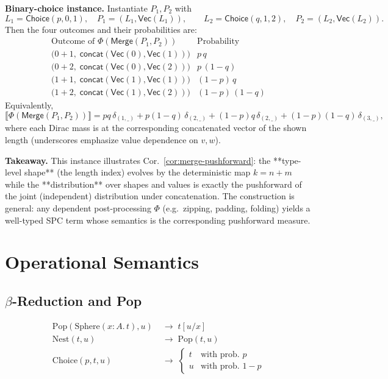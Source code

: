 \documentclass{article}
\begin{document}
\medskip
\textbf{Binary-choice instance.}
Instantiate $P_1,P_2$ with
\[
L_1=\mathsf{Choice}(p,0,1),\quad
P_1=(L_1,\mathsf{Vec}(L_1)),
\qquad
L_2=\mathsf{Choice}(q,1,2),\quad
P_2=(L_2,\mathsf{Vec}(L_2)).
\]
Then the four outcomes and their probabilities are:
\[
\begin{array}{c|c}
\text{Outcome of } \Phi(\mathsf{Merge}(P_1,P_2))
& \text{Probability} \\
\hline
\big(0{+}1,\;\mathsf{concat}(\mathsf{Vec}(0),\mathsf{Vec}(1))\big)
& p\,q \\[2pt]
\big(0{+}2,\;\mathsf{concat}(\mathsf{Vec}(0),\mathsf{Vec}(2))\big)
& p\,(1-q) \\[2pt]
\big(1{+}1,\;\mathsf{concat}(\mathsf{Vec}(1),\mathsf{Vec}(1))\big)
& (1-p)\,q \\[2pt]
\big(1{+}2,\;\mathsf{concat}(\mathsf{Vec}(1),\mathsf{Vec}(2))\big)
& (1-p)\,(1-q)
\end{array}
\]
Equivalently,
\[
\llbracket \Phi(\mathsf{Merge}(P_1,P_2)) \rrbracket
= pq\,\delta_{(1,\_)} + p(1-q)\,\delta_{(2,\_)}
+ (1-p)q\,\delta_{(2,\_)} + (1-p)(1-q)\,\delta_{(3,\_)},
\]
where each Dirac mass is at the corresponding concatenated vector of the shown
length (underscores emphasize value dependence on $v,w$).

\medskip
\textbf{Takeaway.}
This instance illustrates Cor.~\ref{cor:merge-pushforward}: the **type-level
shape** (the length index) evolves by the deterministic map $k=n{+}m$ while the
**distribution** over shapes and values is exactly the pushforward of the joint
(independent) distribution under concatenation. The construction is general:
any dependent post-processing $\Phi$ (e.g.\ zipping, padding, folding) yields a
well-typed SPC term whose semantics is the corresponding pushforward measure.

\section{Operational Semantics}\label{sec:operational}

\subsection{$\beta$-Reduction and Pop}

\begin{align*}
\mathrm{Pop}(\mathrm{Sphere}(x{:}A.\,t),u) &\;\to\; t[u/x] \\
\mathrm{Nest}(t,u) &\;\to\; \mathrm{Pop}(t,u) \\
\mathrm{Choice}(p,t,u) &\;\to\; \begin{cases}
t & \text{with prob.\ } p \\
u & \text{with prob.\ } 1-p
\end{cases}
\end{align*}
\end{document}
